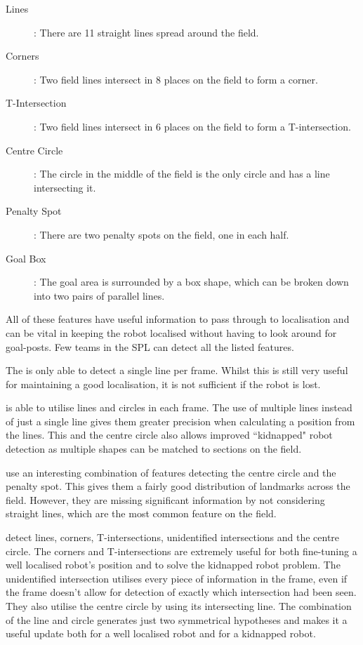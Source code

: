 \documentclass{article}
\begin{document}
\begin{description}
\item[Lines]: There are 11 straight lines spread around the field.
\item[Corners]: Two field lines intersect in 8 places on the field to form a corner.
\item[T-Intersection]: Two field lines intersect in 6 places on the field to form a T-intersection.
\item[Centre Circle]: The circle in the middle of the field is the only circle and has a line intersecting it.
\item[Penalty Spot]: There are two penalty spots on the field, one in each half.
\item[Goal Box]: The goal area is surrounded by a box shape, which can be broken down into two pairs of parallel lines.
\end{description}

All of these features have useful information to pass through to localisation and can be vital in keeping the robot localised without having to look around for goal-posts. Few teams in the SPL can detect all the listed features. 

The \citeauthor{UPenn2010}  is only able to detect a single line per frame. Whilst this is still very useful for maintaining a good localisation, it is not sufficient if the robot is lost.

\citeauthor{uTAustin2010}  is able to utilise lines and circles in each frame. The use of multiple lines instead of just a single line gives them greater precision when calculating a position from the lines. This and the centre circle also allows improved ``kidnapped" robot detection as multiple shapes can be matched to sections on the field.

\citeauthor{Edinferno2010}  use an interesting combination of features detecting the centre circle and the penalty spot. This gives them a fairly good distribution of landmarks across the field. However, they are missing significant information by not considering straight lines, which are the most common feature on the field.

\citeauthor{NaoDevils2010}  detect lines, corners, T-intersections, unidentified intersections and the centre circle. The corners and T-intersections are extremely useful for both fine-tuning a well localised robot's position and to solve the kidnapped robot problem. The unidentified intersection utilises every piece of information in the frame, even if the frame doesn't allow for detection of exactly which intersection had been seen. They also utilise the centre circle by using its intersecting line. The combination of the line and circle generates just two symmetrical hypotheses and makes it a useful update both for a well localised robot and for a kidnapped robot.
\end{document}
